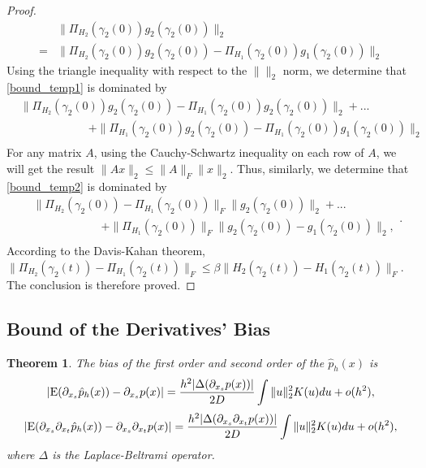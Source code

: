 \documentclass[aos,preprint]{imsart}
\newtheorem{theorem}{Theorem}[section]
\theoremstyle{remark}
\begin{document}
\begin{appendix}
\begin{proof}
\begin{equation}
\begin{aligned}
 &\|\Pi_{H_2}(\gamma_2(0))g_2(\gamma_2(0))\|_2\\
 =&  \|\Pi_{H_2}(\gamma_2(0))g_2(\gamma_2(0)) - \Pi_{H_1}(\gamma_2(0))g_1(\gamma_2(0))\|_2
 \end{aligned}
 \end{equation}
 Using the triangle inequality with respect to the $\|\|_2$ norm, we determine that \eqref{bound_temp1} is dominated by
 \begin{equation}\label{bound_temp2}
 \begin{aligned}
& \|\Pi_{H_2}(\gamma_2(0))g_2(\gamma_2(0)) -\Pi_{H_1}(\gamma_2(0)){g_2}(\gamma_2(0)) \|_2 +...\\
 & \quad \quad  \quad \quad  \quad \quad + \|\Pi_{H_1}(\gamma_2(0)){g_2}(\gamma_2(0)) - \Pi_{H_1}(\gamma_2(0))g_1(\gamma_2(0))\|_2\\
 \end{aligned}
 \end{equation}
 For any matrix $A$, using the Cauchy-Schwartz inequality on each row of $A$, we will get the result $\|Ax\|_2\leq \|A\|_F\|x\|_2$. Thus, similarly, we determine that \eqref{bound_temp2} is dominated by
 \[
 \begin{aligned}
 & \|\Pi_{H_2}(\gamma_2(0)) - \Pi_{H_1}(\gamma_2(0))\|_F\|g_2(\gamma_2(0))\|_2 +...\\
 &\quad \quad  \quad \quad  \quad \quad  +\|\Pi_{H_1}(\gamma_2(0))\|_F\|g_2(\gamma_2(0))-g_1(\gamma_2(0))\|_2, \\
 \end{aligned}.
 \]
According to the Davis-Kahan theorem, $\|\Pi_{H_2}(\gamma_2(t))-\Pi_{H_1}(\gamma_2(t))\|_F \leq \beta\|H_2(\gamma_2(t))-H_1(\gamma_2(t))\|_F$. The conclusion is therefore proved.
\end{proof}


\subsection{Bound of the Derivatives' Bias}\label{bias_proof}
\begin{theorem}
The bias of the first order and second order of the $\hat{p}_h(x)$ is 
\begin{equation*}\label{BiasResult}
|{\rm E}(\partial_{x_s}  \hat{p}_h(x)) - \partial_{x_s}p(x)|  = \frac{h^2|\Delta (\partial_{x_s}p(x))|}{2D}  \int \|u\|_2^2 K(u) du+o(h^2),
\end{equation*}
\begin{equation*}\label{order2}
|{\rm E}( \partial_{x_s} \partial_{x_t}  \hat{p}_h(x)) -  \partial_{x_s} \partial_{x_t} p(x)| = \frac{h^2 |\Delta (\partial_{x_s}\partial_{x_t} p(x))|}{2D} \int \|u\|_2^2 K(u) du+o(h^2),
\end{equation*}
where $\Delta$ is the Laplace-Beltrami operator.
\end{theorem}


\end{appendix}
\end{document}
